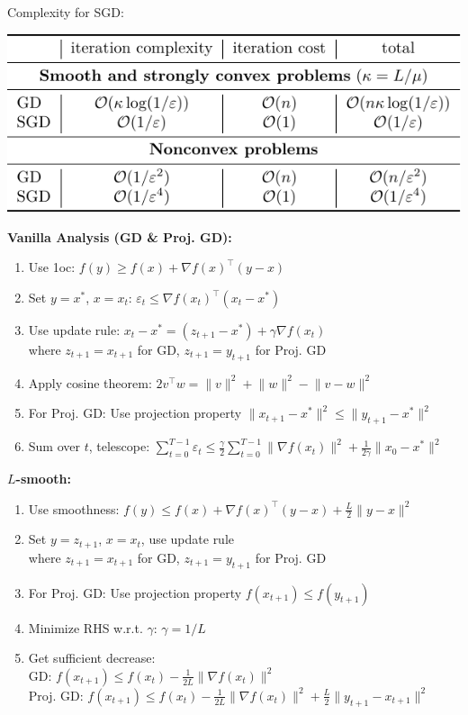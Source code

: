 Complexity for SGD:

\begin{minipage}{\columnwidth}
    \centering
    \includegraphics[width=\columnwidth]{../assets/sgd-table/sgd-table.pdf}
\end{minipage}

\textbf{Vanilla Analysis (GD \& Proj. GD):}
\begin{enumerate}
\item Use 1oc: $f(y) \geq f(x) + \nabla f(x)^\top (y-x)$
\item Set $y=x^*$, $x=x_t$: $\varepsilon_t \leq \nabla f(x_t)^\top (x_t - x^*)$
\item Use update rule: $x_t - x^* = (z_{t+1} - x^*) + \gamma \nabla f(x_t)$
    \\ where $z_{t+1} = x_{t+1}$ for GD, $z_{t+1} = y_{t+1}$ for Proj. GD
\item Apply cosine theorem: $2v^\top w = \lVert v \rVert^2 + \lVert w \rVert^2 - \lVert v-w \rVert^2$
\item For Proj. GD: Use projection property $\lVert x_{t+1} - x^* \rVert^2 \leq \lVert y_{t+1} - x^* \rVert^2$
\item Sum over $t$, telescope: $\sum_{t=0}^{T-1} \varepsilon_t \leq \frac{\gamma}{2} \sum_{t=0}^{T-1} \lVert \nabla f(x_t) \rVert^2 + \frac{1}{2\gamma} \lVert x_0 - x^* \rVert^2$
\end{enumerate}

\textbf{$L$-smooth:}
\begin{enumerate}
\item Use smoothness: $f(y) \leq f(x) + \nabla f(x)^\top (y-x) + \frac{L}{2}\lVert y-x \rVert^2$
\item Set $y=z_{t+1}$, $x=x_t$, use update rule
    \\ where $z_{t+1} = x_{t+1}$ for GD, $z_{t+1} = y_{t+1}$ for Proj. GD
\item For Proj. GD: Use projection property $f(x_{t+1}) \leq f(y_{t+1})$
\item Minimize RHS w.r.t. $\gamma$: $\gamma = 1/L$
\item Get sufficient decrease:
    \\ GD: $f(x_{t+1}) \leq f(x_t) - \frac{1}{2L} \lVert \nabla f(x_t) \rVert^2$
    \\ Proj. GD: $f(x_{t+1}) \leq f(x_t) - \frac{1}{2L} \lVert \nabla f(x_t) \rVert^2 + \frac{L}{2} \lVert y_{t+1} - x_{t+1} \rVert^2$
\end{enumerate}

